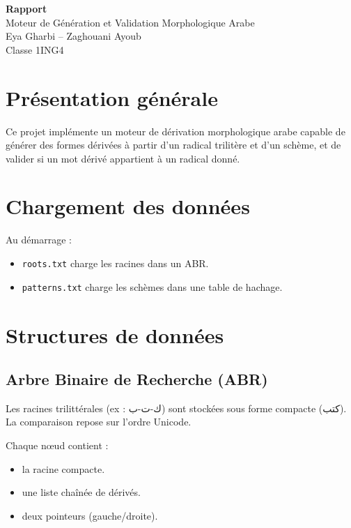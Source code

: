 \documentclass[11pt,a4paper]{article}
\begin{document}
\begin{center}
{\Large \textbf{Rapport}}\\[0.2cm]
{\normalsize Moteur de Génération et Validation Morphologique Arabe}\\[0.3cm]
{\small Eya Gharbi -- Zaghouani Ayoub}\\
{\small Classe 1ING4}
\end{center}

\section{Présentation générale}

Ce projet implémente un moteur de dérivation morphologique arabe capable de générer des formes dérivées à partir d’un radical trilitère et d’un schème, et de valider si un mot dérivé appartient à un radical donné.

\section{Chargement des données}

Au démarrage :
\begin{itemize}[nosep]
\item \texttt{roots.txt} charge les racines dans un ABR.
\item \texttt{patterns.txt} charge les schèmes dans une table de hachage.
\end{itemize}

\section{Structures de données}

\subsection{Arbre Binaire de Recherche (ABR)}

Les racines trilittérales (ex : \textarabic{ك-ت-ب}) sont stockées sous forme compacte (\textarabic{كتب}).  
La comparaison repose sur l’ordre Unicode.

Chaque nœud contient :
\begin{itemize}[nosep]
\item la racine compacte.
\item une liste chaînée de dérivés.
\item deux pointeurs (gauche/droite).
\end{itemize}
\end{document}
